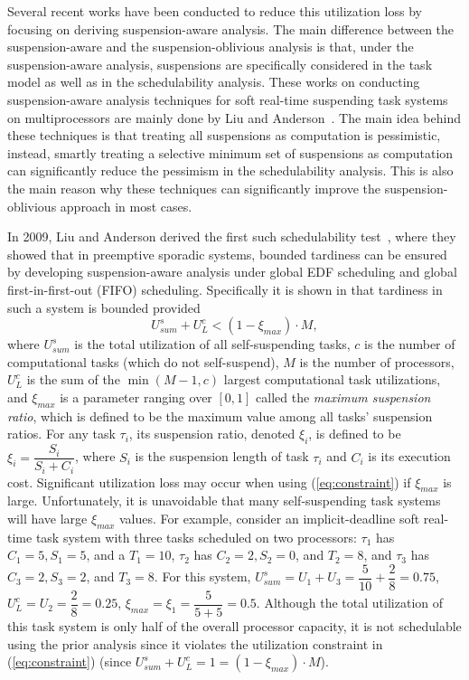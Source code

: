 Several recent works have been conducted to reduce this utilization loss by focusing on deriving suspension-aware analysis. The main difference between the suspension-aware and the suspension-oblivious analysis is that, under the suspension-aware analysis, suspensions are specifically considered in the task model as well as in the schedulability analysis. These works on conducting suspension-aware analysis techniques for soft real-time suspending task systems on multiprocessors are mainly done by Liu and Anderson~\cite{Liu3,Liu4,Liu5,Liu9,Liu11}. The main idea behind these techniques is that treating all suspensions as computation is pessimistic, instead, smartly treating a selective minimum set of suspensions as computation can significantly reduce the pessimism in the schedulability analysis. This is also the main reason why these techniques can significantly improve the suspension-oblivious approach in most cases.

In 2009, Liu and Anderson derived the first such schedulability test~\cite{Liu3}, where they showed that in preemptive sporadic systems, bounded tardiness can be ensured by developing suspension-aware analysis under global EDF scheduling and global first-in-first-out (FIFO) scheduling. Specifically it is shown in \cite{Liu3} that tardiness in such a system is bounded provided 
\begin{equation}\label{eq:constraint} U_{sum}^s + U_L^c < (1-\xi_{max}) \cdot M , \end{equation}
where $U_{sum}^s$ is the total utilization of all self-suspending tasks, $c$ is the number of computational tasks (which do not self-suspend), $M$ is the number of processors, $U_L^c$ is the sum of the $\min(M-1,c)$ largest computational task utilizations, and $\xi_{max}$ is a parameter ranging over $[0,1]$ called the \textit{maximum suspension ratio}, which is defined to be the maximum value among all tasks' suspension ratios. For any task $\tau_i$, its suspension ratio, denoted $\xi_i$, is defined to be $\xi_i = \dfrac{S_i}{S_i+C_i}$, where $S_i$ is the suspension length of task $\tau_i$ and $C_i$ is its execution cost.  Significant utilization loss may occur when using (\ref{eq:constraint}) if $\xi_{max}$ is large. Unfortunately, it is unavoidable that many self-suspending task systems will have large $\xi_{max}$ values. For example, consider an implicit-deadline soft real-time task system with three tasks scheduled on two processors: $\tau_1$ has $C_1=5, S_1=5$, and a $T_1=10$, $\tau_2$ has $C_2=2, S_2=0$, and $T_2=8$, and $\tau_3$ has $C_3=2, S_3=2$, and $T_3=8$. For this system, $U_{sum}^s = U_1+U_3= \dfrac{5}{10} + \dfrac{2}{8} = 0.75$, $U_L^c = U_2 = \dfrac{2}{8} = 0.25$, $\xi_{max} = \xi_1 = \dfrac{5}{5+5} = 0.5$. Although the total utilization of this task system is only half of the overall processor capacity, it is not schedulable using the prior analysis since it violates the utilization constraint in (\ref{eq:constraint}) (since $U_{sum}^s+U_L^c =1=(1-\xi_{max}) \cdot M$).

